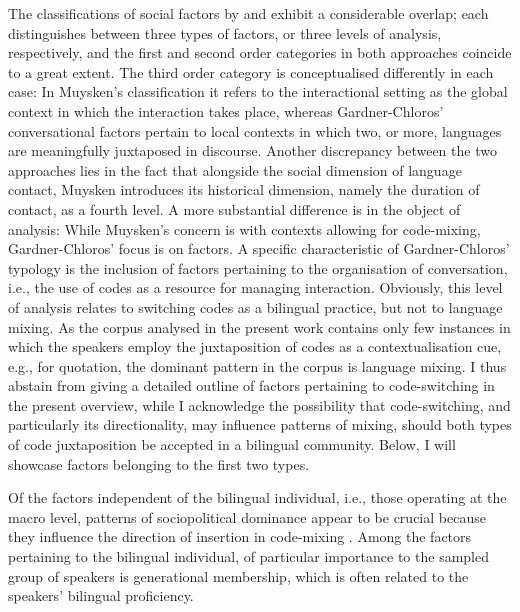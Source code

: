 The classifications of social factors by \citet[][222--223]{muysken-bilingual-2000} and \citet[][42--43]{gardner-chloros_code-switching_2009} exhibit a considerable overlap; each distinguishes between three types of factors, or three levels of analysis, respectively, and the first and second order categories in both approaches coincide to a great extent. The third order category is conceptualised differently in each case: In Muysken's classification it refers to the interactional setting as the global context in which the interaction takes place, whereas Gardner-Chloros' conversational factors pertain to local contexts in which two, or more, languages are meaningfully juxtaposed in discourse. Another discrepancy between the two approaches lies in the fact that alongside the social dimension of language contact, Muysken introduces its historical dimension, namely the duration of contact, as a fourth level. A more substantial difference is in the object of analysis: While Muysken's concern is with contexts allowing for code-mixing, Gardner-Chloros' focus is on factors. A specific characteristic of Gardner-Chloros' typology is the inclusion of factors pertaining to the organisation of conversation, i.e., the use of codes as a resource for managing interaction. Obviously, this level of analysis relates to switching codes as a bilingual practice, but not to language mixing. As the corpus analysed in the present work contains only few instances in which the speakers employ the juxtaposition of codes as a contextualisation cue, e.g., for quotation, the dominant pattern in the corpus is language mixing. I thus abstain from giving a detailed outline of factors pertaining to code-switching in the present overview, while I acknowledge the possibility that code-switching, and particularly its directionality, may influence patterns of mixing, should both types of code juxtaposition be accepted in a bilingual community. Below, I will showcase factors belonging to the first two types.

Of the factors independent of the bilingual individual, i.e., those operating at the macro level, patterns of sociopolitical dominance appear to be crucial because they influence the direction of insertion in code-mixing \citep[][224]{muysken-bilingual-2000}. Among the factors pertaining to the bilingual individual, of particular importance to the sampled group of speakers is generational membership, which is often related to the speakers' bilingual proficiency.

